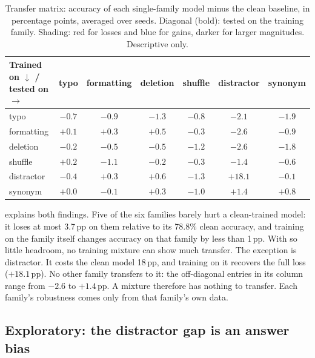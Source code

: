 \documentclass[11pt]{article}
\newcommand{\ppts}{\,pp}
\newcommand{\pfam}[1]{\textsf{#1}}
\newcommand{\negA}{\cellcolor{red!12}}
\newcommand{\negB}{\cellcolor{red!25}}
\newcommand{\negC}{\cellcolor{red!40}}
\newcommand{\posA}{\cellcolor{blue!12}}
\newcommand{\posC}{\cellcolor{blue!40}}
\begin{document}
\begin{table}[t]
\centering
\small
\caption{Transfer matrix: accuracy of each single-family model minus the clean baseline, in percentage points, averaged over seeds. Diagonal (bold): tested on the training family. Shading: red for losses and blue for gains, darker for larger magnitudes. Descriptive only.}
\label{tab:transfer}
\begin{tabular}{@{}l *{6}{c}@{}}
\toprule
Trained on $\downarrow$ / tested on $\rightarrow$ & \pfam{typo} & \pfam{formatting} & \pfam{deletion} & \pfam{shuffle} & \pfam{distractor} & \pfam{synonym} \\
\midrule
\pfam{typo}       & \negA$\mathbf{-0.7}$ & \negA$-0.9$ & \negA$-1.3$ & \negA$-0.8$ & \negB$-2.1$ & \negB$-1.9$ \\
\pfam{formatting} & $+0.1$ & $\mathbf{+0.3}$ & \posA$+0.5$ & $-0.3$ & \negC$-2.6$ & \negA$-0.9$ \\
\pfam{deletion}   & $-0.2$ & \negA$-0.5$ & \negA$\mathbf{-0.5}$ & \negA$-1.2$ & \negC$-2.6$ & \negB$-1.8$ \\
\pfam{shuffle}    & $+0.2$ & \negA$-1.1$ & $-0.2$ & $\mathbf{-0.3}$ & \negA$-1.4$ & \negA$-0.6$ \\
\pfam{distractor} & $-0.4$ & $+0.3$ & \posA$+0.6$ & \negA$-1.3$ & \posC$\mathbf{+18.1}$ & $-0.1$ \\
\pfam{synonym}    & $+0.0$ & $-0.1$ & $+0.3$ & \negA$-1.0$ & \posA$+1.4$ & \posA$\mathbf{+0.8}$ \\
\bottomrule
\end{tabular}
\end{table}

 explains both findings. Five of the six families barely hurt a clean-trained model: it loses at most 3.7\ppts{} on them relative to its 78.8\% clean accuracy, and training on the family itself changes accuracy on that family by less than 1\ppts{}. With so little headroom, no training mixture can show much transfer. The exception is \pfam{distractor}. It costs the clean model 18\ppts{}, and training on it recovers the full loss ($+18.1$\ppts{}). No other family transfers to it: the off-diagonal entries in its column range from $-2.6$ to $+1.4$\ppts{}. A mixture therefore has nothing to transfer. Each family's robustness comes only from that family's own data.

\subsection{Exploratory: the distractor gap is an answer bias}
\label{sec:distractor}
\end{document}
